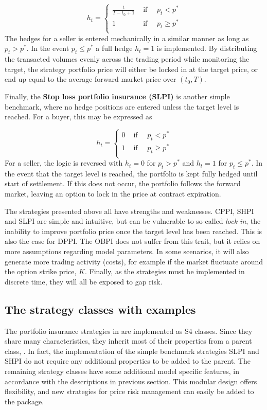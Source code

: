 \begin{equation}
h_t =
\begin{cases}
\frac{t}{T-t_0 +1} & \text{ if } \quad p_t < p^*\\
1  & \text{ if } \quad p_t \geq p^* \\
\end{cases}
\end{equation}
The hedges for a seller is entered mechanically in a similar manner as long as $ p_t > p^*$. In the event $p_t \leq p^*$ a full hedge $h_t = 1$ is implemented. By distributing the transacted volumes evenly across the trading period while monitoring the target, the strategy portfolio price will either be locked in at the target price, or end up equal to the average forward market price over $(t_0, T)$.

Finally, the \textbf{Stop loss portfolio insurance (SLPI)} is another simple benchmark, where no hedge positions are entered unless the target level is reached. For a buyer, this may be expressed as 

\begin{equation}
h_t =
\begin{cases}
0 & \text{ if } \quad p_t < p^*\\
1  & \text{ if } \quad p_t \geq p^* \\
\end{cases}
\end{equation}
For a seller, the logic is reversed with $h_t=0$ for $p_t > p^*$ and $h_t=1$ for $p_t \leq p^*$. In the event that the target level is reached, the portfolio is kept fully hedged until start of settlement. If this does not occur, the portfolio follows the forward market, leaving an option to lock in the price at contract expiration.

The strategies presented above all have strengths and weaknesses. CPPI, SHPI and SLPI are simple and intuitive, but can be vulnerable to so-called \textit{lock in}, the inability to improve portfolio price once the target level has been reached. This is also the case for DPPI. The OBPI does not suffer from this trait, but it relies on more assumptions regarding model parameters. In some scenarios, it will also generate more trading activity (costs), for example if the market fluctuate around the option strike price, $K$.  Finally, as the strategies must be implemented in discrete time, they will all be exposed to gap risk.

\subsection{The strategy classes with examples}
The portfolio insurance strategies in  are implemented as S4 classes. Since they share many characteristics, they inherit most of their properties from a parent class,  . In fact, the implementation of the simple benchmark strategies SLPI and SHPI do not require any additional properties to be added to the parent. The remaining strategy classes have some additional model specific features, in accordance with the descriptions in previous section. This modular design offers flexibility, and new strategies for price risk management can easily be added to the package.

